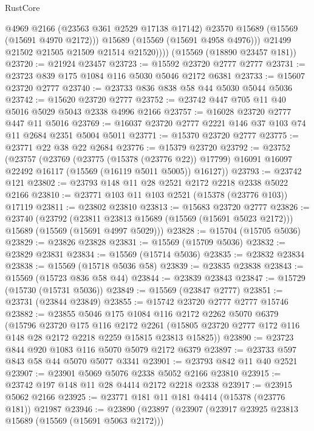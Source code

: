 \begin{lexlean}{RustCore}
\begin{coremodule}
                @4969
                @2166
                (@23563 @361 @2529 @17138 @17142)
                @23570
                @15689
                (@15569 (@15691 @4970 @2172)))
              @15689
              (@15569 (@15691 @4958 @4976)))
            @21499
            @21502
            @21505
            @21509
            @21514
            @21520))))
    (@15569 (@18890 @23457 @181))
@23720 := @21924 @23457
@23723 := @15592 @23720 @2777 @2777
@23731 := @23723 @839 @175 @1084 @116 @5030 @5046 @2172 @6381
@23733 := @15607 @23720 @2777
@23740 := @23733 @836 @838 @58 @44 @5030 @5044 @5036
@23742 := @15620 @23720 @2777
@23752 := @23742 @447 @705 @11 @40 @5016 @5029 @5043 @2338 @4996 @2166
@23757 := @16028 @23720 @2777 @447 @11 @5016
@23769 := @16037 @23720 @2777 @2221 @146 @37 @103 @74 @11 @2684 @2351 @5004 @5011
@23771 := @15370 @23720 @2777
@23775 := @23771 @22 @38 @22 @2684
@23776 := @15379 @23720
@23792 := @23752
    (@23757
      (@23769
        (@23775 (@15378 (@23776 @22)) @17799)
        @16091
        @16097
        @22492
        @16117
        (@15569 (@16119 @5011 @5005))
        @16127))
@23793 := @23742 @121
@23802 := @23793 @148 @11 @28 @2521 @2172 @2218 @2338 @5022 @2166
@23810 := @23771 @103 @11 @103 @2521 (@15378 (@23776 @103)) @17119
@23811 := @23802 @23810
@23813 := @15683 @23720 @2777
@23826 := @23740
    (@23792
      (@23811 @23813 @15689 (@15569 (@15691 @5023 @2172)))
      @15689
      (@15569 (@15691 @4997 @5029)))
@23828 := @15704 (@15705 @5036)
@23829 := @23826 @23828
@23831 := @15569 (@15709 @5036)
@23832 := @23829 @23831
@23834 := @15569 (@15714 @5036)
@23835 := @23832 @23834
@23838 := @15569 (@15718 @5036 @58)
@23839 := @23835 @23838
@23843 := @15569 (@15723 @836 @58 @44)
@23844 := @23839 @23843
@23847 := @15729 (@15730 (@15731 @5036))
@23849 := @15569 (@23847 @2777)
@23851 := @23731 (@23844 @23849)
@23855 := @15742 @23720 @2777 @2777 @15746
@23882 := @23855
    @5046
    @175
    @1084
    @116
    @2172
    @2262
    @5070
    @6379
    (@15796
      @23720
      @175
      @116
      @2172
      @2261
      (@15805 @23720 @2777 @172 @116 @148 @28 @2172 @2218 @2259 @15815 @23813 @15825))
@23890 := @23723 @844 @920 @1083 @116 @5070 @5079 @2172 @6379
@23897 := @23733 @597 @843 @58 @44 @5070 @5077 @3341
@23901 := @23793 @842 @11 @40 @2521
@23907 := @23901 @5069 @5076 @2338 @5052 @2166 @23810
@23915 := @23742 @197 @148 @11 @28 @4414 @2172 @2218 @2338
@23917 := @23915 @5062 @2166
@23925 := @23771 @181 @11 @181 @4414 (@15378 (@23776 @181)) @21987
@23946 := @23890
    (@23897
      (@23907
        (@23917 @23925 @23813 @15689 (@15569 (@15691 @5063 @2172)))

\end{coremodule}
\end{lexlean}
